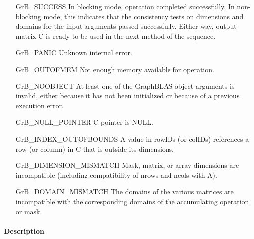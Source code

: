 \begin{itemize}[leftmargin=2.1in]
    \item[{\sf GrB\_SUCCESS}]         In blocking mode, operation
	completed successfully. In non-blocking mode, this indicates
	that the consistency tests on dimensions and domains for the
	input arguments passed successfully. Either way, output matrix
	{\sf C} is ready to be used in the next method of the sequence.

    \item[{\sf GrB\_PANIC}]           Unknown internal error.
    
    \item[{\sf GrB\_OUTOFMEM}]        Not enough memory available for operation.
    
    \item[{\sf GrB\_NOOBJECT}]        At least one of the GraphBLAS object arguments is invalid, either because it has
    not been initialized or because of a previous execution error.
    
    \item[{\sf GrB\_NULL\_POINTER}]  {\sf C} pointer is {\sf NULL}.

    \item[{\sf GrB\_INDEX\_OUTOFBOUNDS}]  A value in {\sf rowIDs} (or {\sf colIDs}) references a 
	    row (or column) in {\sf C} that is outside its dimensions.
    
    \item[{\sf GrB\_DIMENSION\_MISMATCH}] Mask, matrix, or array dimensions are
	    incompatible (including compatibility of {\sf nrows} and {\sf ncols} with {\sf A}). 
    
    \item[{\sf GrB\_DOMAIN\_MISMATCH}]    The domains of the various
	matrices are incompatible with the corresponding domains of the
	accumulating operation or mask.
\end{itemize}

\paragraph{Description}

